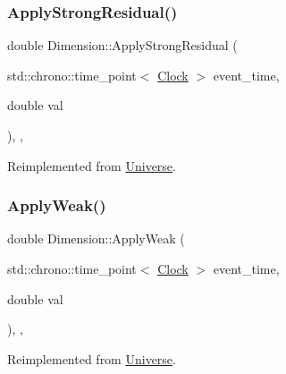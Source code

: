 \subsubsection{\texorpdfstring{Apply\+Strong\+Residual()}{ApplyStrongResidual()}}
{\footnotesize\ttfamily double Dimension\+::\+Apply\+Strong\+Residual (\begin{DoxyParamCaption}\item[{std\+::chrono\+::time\+\_\+point$<$ \mbox{\hyperlink{universe_8h_a0ef8d951d1ca5ab3cfaf7ab4c7a6fd80}{Clock}} $>$}]{event\+\_\+time,  }\item[{double}]{val }\end{DoxyParamCaption})\hspace{0.3cm}{\ttfamily [inline]}, {\ttfamily [final]}, {\ttfamily [virtual]}}



Reimplemented from \mbox{\hyperlink{classUniverse_af7becebb347be9a85541d96a3eca1ca7}{Universe}}.

\mbox{\label{classDimension_a72b8ab8d676b4df6b9a6ef948f5693c9}} 
\subsubsection{\texorpdfstring{Apply\+Weak()}{ApplyWeak()}}
{\footnotesize\ttfamily double Dimension\+::\+Apply\+Weak (\begin{DoxyParamCaption}\item[{std\+::chrono\+::time\+\_\+point$<$ \mbox{\hyperlink{universe_8h_a0ef8d951d1ca5ab3cfaf7ab4c7a6fd80}{Clock}} $>$}]{event\+\_\+time,  }\item[{double}]{val }\end{DoxyParamCaption})\hspace{0.3cm}{\ttfamily [inline]}, {\ttfamily [final]}, {\ttfamily [virtual]}}



Reimplemented from \mbox{\hyperlink{classUniverse_a6d1226b3adec3c42a833afdbb6a65a92}{Universe}}.

\mbox{\label{classDimension_abf490cabd486afa660f17940ed0d17e6}} 

